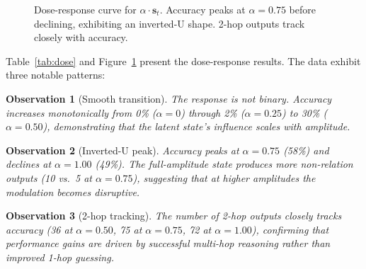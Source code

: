\documentclass[11pt,a4paper]{article}
\newtheorem{observation}{Observation}
\begin{document}
\begin{figure}[t]
\centering
{}
\caption{Dose-response curve for $\alpha \cdot \mathbf{s}_t$. Accuracy peaks at $\alpha = 0.75$ before declining, exhibiting an inverted-U shape. 2-hop outputs track closely with accuracy.}
\label{fig:dose}
\end{figure}

Table~\ref{tab:dose} and Figure~\ref{fig:dose} present the dose-response results. The data exhibit three notable patterns:

\begin{observation}[Smooth transition]
The response is not binary. Accuracy increases monotonically from 0\% ($\alpha = 0$) through 2\% ($\alpha = 0.25$) to 30\% ($\alpha = 0.50$), demonstrating that the latent state's influence scales with amplitude.
\end{observation}

\begin{observation}[Inverted-U peak]
Accuracy peaks at $\alpha = 0.75$ (58\%) and declines at $\alpha = 1.00$ (49\%). The full-amplitude state produces more non-relation outputs (10 vs.\ 5 at $\alpha = 0.75$), suggesting that at higher amplitudes the modulation becomes disruptive.
\end{observation}

\begin{observation}[2-hop tracking]
The number of 2-hop outputs closely tracks accuracy (36 at $\alpha = 0.50$, 75 at $\alpha = 0.75$, 72 at $\alpha = 1.00$), confirming that performance gains are driven by successful multi-hop reasoning rather than improved 1-hop guessing.
\end{observation}
\end{document}
